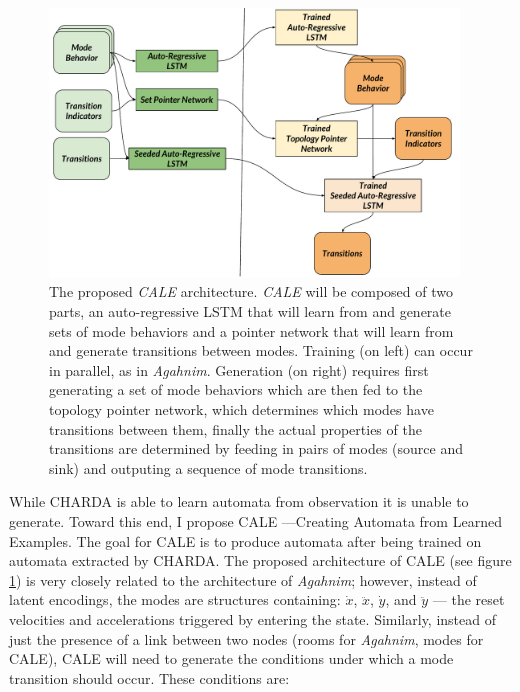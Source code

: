 \documentclass[12pt]{report}
\begin{document}
\begin{figure}[ht]
\centering
    \includegraphics[width=0.97\textwidth]{figures/CALE_Architecture.pdf} 
   
    \caption{The proposed \textit{CALE} architecture.  \textit{CALE} will be composed of two parts, an auto-regressive LSTM that will learn from and generate sets of mode behaviors and a pointer network that will learn from and generate transitions between modes. Training (on left) can occur in parallel, as in \textit{Agahnim}.  Generation (on right) requires first generating a set of mode behaviors which are then fed to the topology pointer network, which determines which modes have transitions between them, finally the actual properties of the transitions are determined by feeding in pairs of modes (source and sink) and outputing a sequence of mode transitions.}
  \label{fig:cale}
  \end{figure}

While CHARDA is able to learn automata from observation it is unable to generate.  Toward this end, I propose CALE ---Creating Automata from Learned Examples.  The goal for CALE is to produce automata after being trained on automata extracted by CHARDA.  The proposed architecture of CALE (see figure \ref{fig:cale}) is very closely related to the architecture of \textit{Agahnim}; however, instead of latent encodings, the modes are structures containing: $\dot{x}$, $\ddot{x}$, $\dot{y}$, and $\ddot{y}$  --- the reset velocities and accelerations triggered by entering the state.  Similarly, instead of just the presence of a link between two nodes (rooms for \textit{Agahnim}, modes for CALE), CALE will need to generate the conditions under which a mode transition should occur.  These conditions are:
\end{document}
